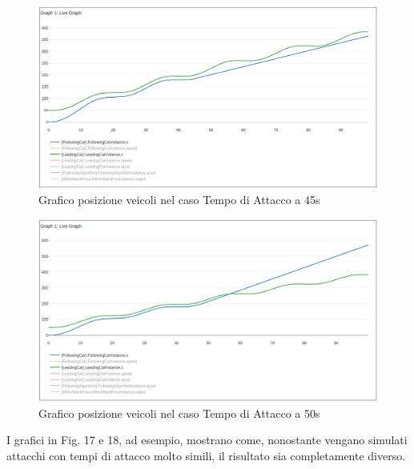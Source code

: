 \begin{figure}[H]
	\centering
	\includegraphics[width=\textwidth]{img/AttackAccel0T45X.png}
	\caption{Grafico posizione veicoli nel caso Tempo di Attacco a 45s}
\end{figure}

\begin{figure}[H]
	\centering
	\includegraphics[width=\textwidth]{img/AttackAccel0T50X.png}
	\caption{Grafico posizione veicoli nel caso Tempo di Attacco a 50s}
\end{figure}

I grafici in Fig. 17 e 18, ad esempio, mostrano come, nonostante vengano simulati attacchi con tempi di attacco molto simili, il risultato sia completamente diverso.
